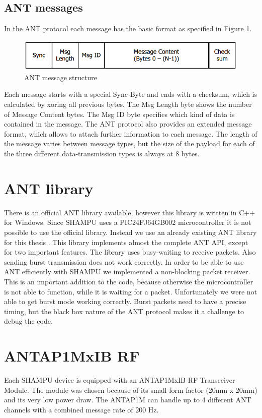 \subsection{ANT messages}
In the ANT protocol each message has the basic format as specified in Figure \ref{fig:antmsg}.
\begin{figure}[H]
	\centering
	\includegraphics[scale=.75]{content/images/ANTmsg.png}
	\caption{ANT message structure\cite{DynastreamInnovationsInc.2013}}\label{fig:antmsg}
\end{figure}
Each message starts with a special Sync-Byte and ends with a checksum, which is calculated by xoring all previous bytes. The Msg Length byte shows the number of Message Content bytes. The Msg ID byte specifies which kind of data is contained in the message. The ANT protocol also provides an extended message format, which allows to attach further information to each message. The length of the message varies between message types, but the size of the payload for each of the three different data-transmission types is always at 8 bytes.

\section{ANT library}
There is an official ANT library \cite{ANTWinLib} available, however this library is written in C++ for Windows. Since SHAMPU uses a PIC24FJ64GB002 microcontroller\cite{smeets2014demonstration} it is not possible to use the official library. Instead we use an already existing ANT library for this thesis \cite{ANTPICLIB}. This library implements almost the complete ANT API, except for two important features. The library uses busy-waiting to receive packets. Also sending burst transmission does not work correctly. In order to be able to use ANT efficiently with SHAMPU we implemented a non-blocking packet receiver. This is an important addition to the code, because otherwise the microcontroller is not able to function, while it is waiting for a packet. Unfortunately we were not able to get burst mode working correctly. Burst packets need to have a precise timing, but the black box nature of the ANT protocol makes it a challenge to debug the code.
\section{ANTAP1MxIB RF}
Each SHAMPU device is equipped with an ANTAP1MxIB RF Transceiver Module\cite{Networks}. The module was chosen because of its small form factor (20mm x 20mm) and its very low power draw. The ANTAP1M can handle up to 4 different ANT channels with a combined message rate of 200 Hz. 

